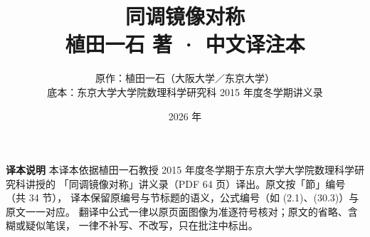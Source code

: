 

\title{\bfseries 同调镜像对称\\[6pt]
  \large\mdseries 植田一石 著 · 中文译注本}
\author{原作：植田一石（大阪大学／东京大学）\\[2pt]
  \small 底本：东京大学大学院数理科学研究科 2015 年度冬学期讲义录}
\date{2026 年}


\maketitle
\thispagestyle{empty}

\vspace{2em}
\begin{center}
\begin{minipage}{0.86\textwidth}
\small
\textbf{译本说明}\quad
本译本依据植田一石教授 2015 年度冬学期于东京大学大学院数理科学研究科讲授的
「同调镜像对称」讲义录（PDF 64 页）译出。原文按「節」编号（共 34 节），
译本保留原编号与节标题的语义，公式编号（如 (2.1)、(30.3)）与原文一一对应。
翻译中公式一律以原页面图像为准逐符号核对；原文的省略、含糊或疑似笔误，
一律不补写、不改写，只在批注中标出。
\end{minipage}
\end{center}

\vspace{1em}
\tableofcontents
\newpage
















